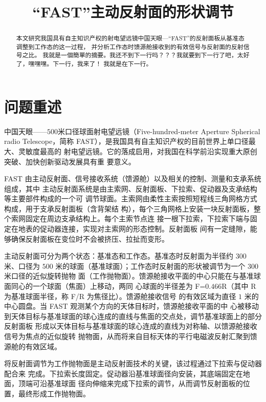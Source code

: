 \documentclass[withoutpreface,bwprint]{cumcmthesis} %
\title{“FAST”主动反射面的形状调节}
\begin{document}
\maketitle
\begin{abstract}
本文研究我国具有自主知识产权的射电望远镜中国天眼---“FAST”的反射面板从基准态调整到工作态的这一过程，
并分析工作态时馈源舱接收到的有效信号与反射面的反射信号之比。
我就是一個簡單的摘要。我还不到下一行吗？？？我就要到下一行了吧，太好了，嘿嘿嘿。下一行，我来了！
我就是在下一行。
\end{abstract}



\section{问题重述}
中国天眼——$500$米口径球面射电望远镜（Five-hundred-meter Aperture Spherical radio
Telescope，简称 FAST），是我国具有自主知识产权的目前世界上单口径最大、灵敏度最高的
射电望远镜。它的落成启用，对我国在科学前沿实现重大原创突破、加快创新驱动发展具有重
要意义。

FAST 由主动反射面、信号接收系统（馈源舱）以及相关的控制、测量和支承系统组成，其中
主动反射面系统是由主索网、反射面板、下拉索、促动器及支承结构等主要部件构成的一个可
调节球面。主索网由柔性主索按照短程线三角网格方式构成，用于支承反射面板（含背架结
构），每个三角网格上安装一块反射面板，整个索网固定在周边支承结构上。每个主索节点连
接一根下拉索，下拉索下端与固定在地表的促动器连接，实现对主索网的形态控制。反射面板
间有一定缝隙，能够确保反射面板在变位时不会被挤压、拉扯而变形。

主动反射面可分为两个状态：基准态和工作态。基准态时反射面为半径约 $300$ 米、口径为
$500$ 米的球面（基准球面）；工作态时反射面的形状被调节为一个 $300$ 米口径的近似旋转抛物
面（工作抛物面）。馈源舱接收平面的中心只能在与基准球面同心的一个球面（焦面）上移动，两同
心球面的半径差为 F=$0.466$R（其中 R 为基准球面半径，称 F/R 为焦径比）。馈源舱接收信号
的有效区域为直径 $1$ 米的中心圆盘。当 FAST 观测某个方向的天体目标时，馈源舱接收平面的中
心被移动到天体目标与基准球面的球心连成的直线与焦面的交点处，调节基准球面上的部分反射面板
形成以天体目标与基准球面的球心连成的直线为对称轴、以馈源舱接收信号为焦点的近似旋转
抛物面，从而将来自目标天体的平行电磁波反射汇聚到馈源舱的有效区域。

将反射面调节为工作抛物面是主动反射面技术的关键，该过程通过下拉索与促动器配合来
完成。下拉索长度固定。促动器沿基准球面径向安装，其底端固定在地面，顶端可沿基准球面
径向伸缩来完成下拉索的调节，从而调节反射面板的位置，最终形成工作抛物面。
\end{document}
